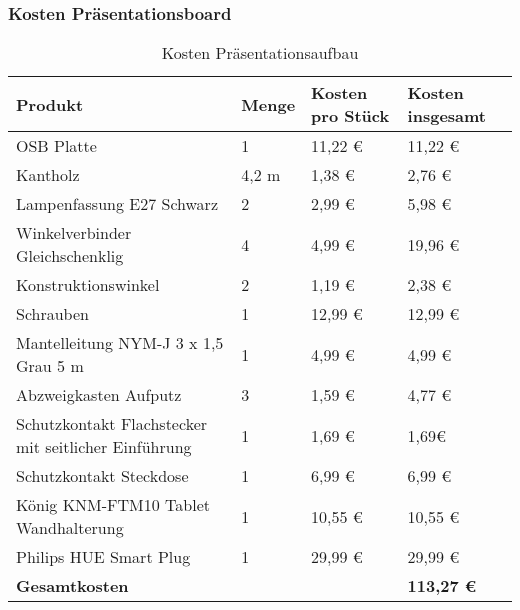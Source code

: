 \subsubsection{Kosten Präsentationsboard}\label{ku_kosten_praesi}
\begin{center}
\begin{table}[H]
    \begin{tabularx}{\textwidth}{|p{5.6cm}|p{1.2cm}|p{3.44cm}|p{3.5cm}|}
        \hline
 	    \textbf{Produkt} & \textbf{Menge} & \textbf{Kosten pro Stück}  & \textbf{Kosten insgesamt}\\
	    \hline
	    \hline
	    OSB Platte & 1 & 11,22 \euro{} & 11,22 \euro{} \\
	    \hline
	    Kantholz & 4,2 m & 1,38 \euro{} & 2,76 \euro{} \\
	    \hline
	    Lampenfassung E27 Schwarz & 2 & 2,99 \euro{} & 5,98 \euro{} \\
	    \hline
	    Winkelverbinder Gleichschenklig & 4 & 4,99 \euro{} & 19,96 \euro{} \\
	    \hline
	    Konstruktionswinkel & 2 & 1,19 \euro{} & 2,38 \euro{} \\
	    \hline
	    Schrauben & 1 & 12,99 \euro{} & 12,99 \euro{} \\
	    \hline
	    Mantelleitung NYM-J 3 x 1,5 Grau 5 m & 1 & 4,99 \euro{} & 4,99 \euro{} \\ 
	    \hline
	    Abzweigkasten Aufputz & 3 & 1,59 \euro{} & 4,77 \euro{} \\
	    \hline
	    Schutzkontakt Flachstecker mit seitlicher Einführung & 1 & 1,69 \euro{}\ & 1,69\euro{} \\
	    \hline
	    Schutzkontakt Steckdose & 1 & 6,99 \euro{} & 6,99 \euro{} \\
	    \hline
	    König KNM-FTM10 Tablet Wandhalterung & 1 & 10,55 \euro{} & 10,55 \euro{} \\
	    \hline
	    Philips HUE Smart Plug & 1 & 29,99 \euro{} & 29,99 \euro{} \\
	    \hline
	    \hline
	    \textbf{Gesamtkosten} &  &  & \textbf{113,27 \euro{}} \\ %
	    \hline
    \end{tabularx}
    \caption{Kosten Präsentationsaufbau}
    \label{tab:ku_kostenpraesi}
\end{table}
\end{center}